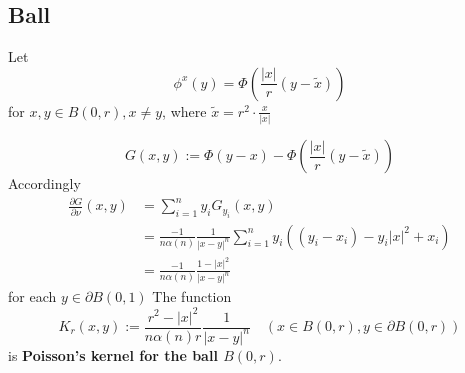 \subsection{Ball}

\begin{definition}
    Let
    $$\phi^x(y)=\Phi\left(\frac{\left|x\right|}{r} (y-\tilde{x})\right)$$
    for $x, y \in B(0,r), x \neq y$, where $\tilde{x}=r^2\cdot\frac{x}{\left|x\right|}$

    \begin{equation*}
        G(x, y):=\Phi(y-x)-\Phi\left(\frac{\left|x\right|}{r} (y-\tilde{x})\right)
    \end{equation*}
    Accordingly
    \begin{equation*}
        \begin{aligned}
            \frac{\partial G}{\partial \nu}(x, y) & =\sum_{i=1}^n y_i G_{y_i}(x, y)                                                                          \\
                                                  & =\frac{-1}{n \alpha(n)} \frac{1}{|x-y|^n} \sum_{i=1}^n y_i\left(\left(y_i-x_i\right)-y_i|x|^2+x_i\right) \\
                                                  & =\frac{-1}{n \alpha(n)} \frac{1-|x|^2}{|x-y|^n}
        \end{aligned}
    \end{equation*}
    for each $y \in \partial B(0,1)$
    The function
    \begin{equation*}
        K_r(x, y):=\frac{r^2-|x|^2}{n \alpha(n) r} \frac{1}{|x-y|^n} \quad \left(x \in B(0, r), y \in \partial B(0, r)\right)
    \end{equation*}
    is \textbf{Poisson's kernel for the ball $B(0, r)$}.
\end{definition}

